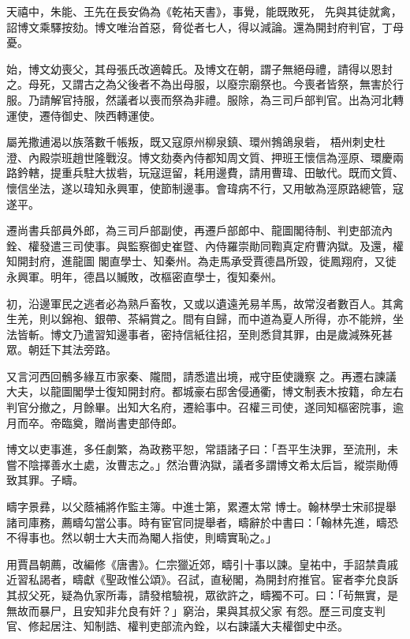 \begin{pinyinscope}
 天禧中，朱能、王先在長安偽為《乾祐天書》，事覺，能既敗死，
 先與其徒就禽，詔博文乘驛按劾。博文唯治首惡，脅從者七人，得以減論。還為開封府判官，丁母憂。



 始，博文幼喪父，其母張氏改適韓氏。及博文在朝，謂子無絕母禮，請得以恩封之。母死，又謂古之為父後者不為出母服，以廢宗廟祭也。今喪者皆祭，無害於行服。乃請解官持服，然議者以喪而祭為非禮。服除，為三司戶部判官。出為河北轉運使，遷侍御史、陜西轉運使。



 屬羌撒逋渴以族落數千帳叛，既又寇原州柳泉鎮、環州鵓鴿泉砦，
 梧州刺史杜澄、內殿崇班趙世隆戰沒。博文劾奏內侍都知周文質、押班王懷信為涇原、環慶兩路鈐轄，提重兵駐大拔砦，玩寇逗留，耗用邊費，請用曹瑋、田敏代。既而文質、懷信坐法，遂以瑋知永興軍，使節制邊事。會瑋病不行，又用敏為涇原路總管，寇遂平。



 遷尚書兵部員外郎，為三司戶部副使，再遷戶部郎中、龍圖閣待制、判吏部流內銓、權發遣三司使事。與監察御史崔暨、內侍羅崇勛同鞫真定府曹汭獄。及還，權知開封府，進龍圖
 閣直學士、知秦州。為走馬承受賈德昌所毀，徙鳳翔府，又徙永興軍。明年，德昌以贓敗，改樞密直學士，復知秦州。



 初，沿邊軍民之逃者必為熟戶畜牧，又或以遺遠羌易羊馬，故常沒者數百人。其禽生羌，則以錦袍、銀帶、茶絹賞之。間有自歸，而中道為夏人所得，亦不能辨，坐法皆斬。博文乃遣習知邊事者，密持信紙往招，至則悉貸其罪，由是歲減殊死甚眾。朝廷下其法旁路。



 又言河西回鶻多緣互市家秦、隴間，請悉遣出境，戒守臣使譏察
 之。再遷右諫議大夫，以龍圖閣學士復知開封府。都城豪右邸舍侵通衢，博文制表木按籍，命左右判官分撤之，月餘畢。出知大名府，遷給事中。召權三司使，遂同知樞密院事，逾月而卒。帝臨奠，贈尚書吏部侍郎。



 博文以吏事進，多任劇繁，為政務平恕，常語諸子曰：「吾平生決罪，至流刑，未嘗不陰擇善水土處，汝曹志之。」然治曹汭獄，議者多謂博文希太后旨，縱崇勛傅致其罪。子疇。



 疇字景彞，以父蔭補將作監主簿。中進士第，累遷太常
 博士。翰林學士宋祁提舉諸司庫務，薦疇勾當公事。時有宦官同提舉者，疇辭於中書曰：「翰林先進，疇恐不得事也。然以朝士大夫而為閹人指使，則疇實恥之。」



 用賈昌朝薦，改編修《唐書》。仁宗獵近郊，疇引十事以諫。皇祐中，手詔禁貴戚近習私謁者，疇獻《聖政惟公頌》。召試，直秘閣，為開封府推官。宦者李允良訴其叔父死，疑為仇家所毒，請發棺驗視，眾欲許之，疇獨不可。曰：「茍無實，是無故而暴尸，且安知非允良有奸？」窮治，果與其叔父家
 有怨。歷三司度支判官、修起居注、知制誥、權判吏部流內銓，以右諫議大夫權御史中丞。




\end{pinyinscope}
